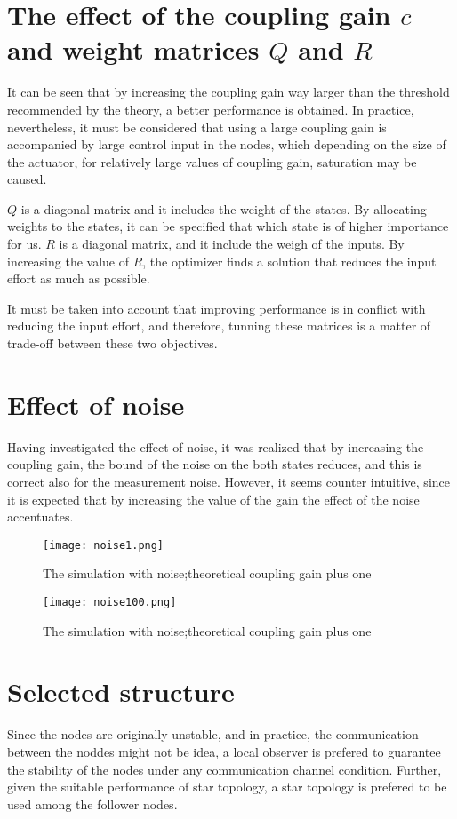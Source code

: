 \section{The effect of the coupling gain $c$ and weight matrices $Q$ and $R$}
It can be seen that by increasing the coupling gain way larger than the threshold recommended by the theory, a better performance is obtained. In practice, nevertheless, it must be considered that using a large coupling gain is accompanied by large control input in the nodes, which depending on the size of the actuator, for relatively large values of coupling gain, saturation may be caused.

$Q$ is a diagonal matrix and it includes the weight of the states. By allocating weights to the states, it can be specified that which state is of higher importance for us.  $R$ is a diagonal matrix, and it include the weigh of the inputs. By increasing the value of $R$, the optimizer finds a solution that reduces the input effort as much as possible. 

It must be taken into account that improving performance is in conflict with reducing the input effort, and therefore, tunning these matrices is a matter of trade-off between these two objectives.


\section{Effect of noise}
Having investigated the effect of noise, it was realized that by increasing the coupling gain, the bound of the noise on the both states reduces, and this is correct also for the measurement noise. However, it seems counter intuitive, since it is expected that by increasing the value of the gain the effect of the noise accentuates.

\begin{figure}[H] %
    \centering
    \texttt{[image: noise1.png]} %
    \caption{The simulation with noise;theoretical coupling gain plus one}
\end{figure}

\begin{figure}[H] %
    \centering
    \texttt{[image: noise100.png]} %
    \caption{The simulation with noise;theoretical coupling gain plus one}
\end{figure}





\section{Selected structure}
Since the nodes are originally unstable, and in practice, the communication between the noddes might not be idea, a local observer is prefered to guarantee the stability of the nodes under any communication channel condition. Further, given the suitable performance of star topology, a star topology is prefered to be used among the follower nodes.

